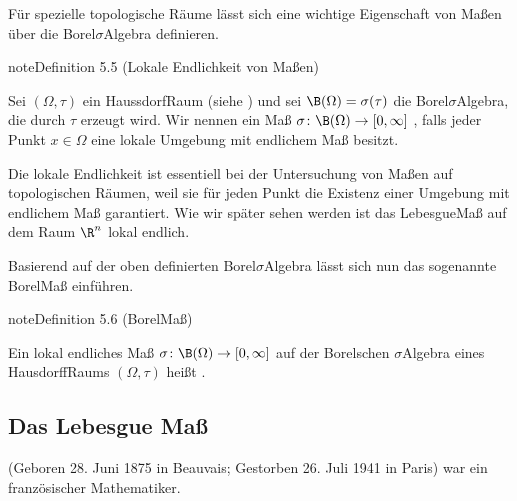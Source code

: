 \documentclass[letterpaper,10pt,english]{jupyterBook}
\begin{document}
\sphinxAtStartPar
Für spezielle topologische Räume lässt sich eine wichtige Eigenschaft von Maßen über die Borel\sphinxhyphen{}\(\sigma\)\sphinxhyphen{}Algebra definieren.
\label{masstheorie/masstheorie:definition-9}
\begin{sphinxadmonition}{note}{Definition 5.5 (Lokale Endlichkeit von Maßen)}



\sphinxAtStartPar
Sei \((\Omega, \tau)\) ein Haussdorf\sphinxhyphen{}Raum (siehe {\hyperref[\detokenize{manifolds/manifolds_prelim:def:hausdorffraum}]{}}) und sei \(\B(\Omega) = \sigma(\tau)\) die Borel\sphinxhyphen{}\(\sigma\)\sphinxhyphen{}Algebra, die durch \(\tau\) erzeugt wird.
Wir nennen ein Maß \(\sigma \colon \B(\Omega) \rightarrow [0, \infty]\) , falls jeder Punkt \(x \in \Omega\) eine lokale Umgebung mit endlichem Maß besitzt.
\end{sphinxadmonition}

\sphinxAtStartPar
Die lokale Endlichkeit ist essentiell bei der Untersuchung von Maßen auf topologischen Räumen, weil sie für jeden Punkt die Existenz einer Umgebung mit endlichem Maß garantiert.
Wie wir später sehen werden ist das Lebesgue\sphinxhyphen{}Maß auf dem Raum \(\R^n\) lokal endlich.

\sphinxAtStartPar
Basierend auf der oben definierten Borel\sphinxhyphen{}\(\sigma\)\sphinxhyphen{}Algebra lässt sich nun das sogenannte Borel\sphinxhyphen{}Maß einführen.
\label{masstheorie/masstheorie:definition-10}
\begin{sphinxadmonition}{note}{Definition 5.6 (Borel\sphinxhyphen{}Maß)}



\sphinxAtStartPar
Ein lokal endliches Maß \(\sigma \colon \B(\Omega) \rightarrow [0, \infty]\) auf der Borelschen \(\sigma\)\sphinxhyphen{}Algebra eines Hausdorff\sphinxhyphen{}Raums \((\Omega,\tau)\) heißt .
\end{sphinxadmonition}


\subsection{Das Lebesgue Maß}
\label{\detokenize{masstheorie/masstheorie:das-lebesgue-masz}}
\begin{sphinxShadowBox}

\sphinxAtStartPar
{} (Geboren 28. Juni 1875 in Beauvais; Gestorben 26. Juli 1941 in Paris) war ein französischer Mathematiker.
\end{sphinxShadowBox}
\end{document}
